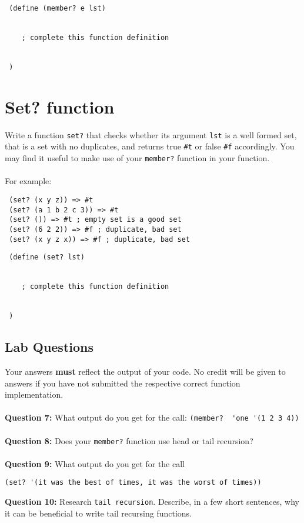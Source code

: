 \documentclass{article}
\begin{document}
\begin{lstlisting}
 (define (member? e lst)
 
 
    ; complete this function definition
    
    
 )
\end{lstlisting}

\section*{Set? function}
Write a function \verb|set?| that checks whether its argument \verb|lst| is a well formed set, that is a set with no duplicates, and returns true \verb|#t| or false \verb|#f| accordingly. You may find it useful to make use of your \verb|member?| function in your function.
\\\\
For example:
\begin{lstlisting}
 (set? (x y z)) => #t
 (set? (a 1 b 2 c 3)) => #t
 (set? ()) => #t ; empty set is a good set
 (set? (6 2 2)) => #f ; duplicate, bad set
 (set? (x y z x)) => #f ; duplicate, bad set
\end{lstlisting}

\begin{lstlisting}
 (define (set? lst)
 
 
    ; complete this function definition
    
    
 )
\end{lstlisting}


\begin{tcolorbox}
 \section*{Lab Questions}
 Your answers \textbf{must} reflect the output of your code. No credit will be given to answers if you have not submitted the respective correct function implementation.
 \\\\
 \textbf{Question 7:} What output do you get for the call: \verb|(member?  'one '(1 2 3 4))|
 \\\\
 \textbf{Question 8:} Does your \verb|member?| function use head or tail recursion?
 \\\\
 \textbf{Question 9:} What output do you get for the call
 \begin{center}
  \verb|(set? '(it was the best of times, it was the worst of times))|
 \end{center}
 \textbf{Question 10:} Research \verb|tail recursion|. Describe, in a few short sentences, why it can be beneficial to write tail recursing functions.

\end{tcolorbox}
\newpage
\end{document}
